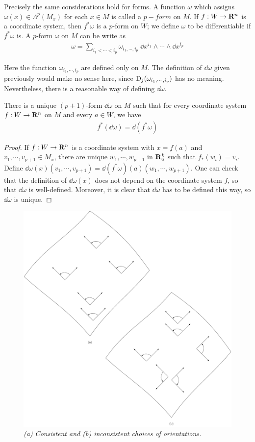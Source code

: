 Precisely the same considerations hold for forms. A function $\omega$ which 
assigns $\omega(x)\in\Lambda^p(M_x)$ for each $x\in M$ is called a $p-form$ on $M$. If 
$f:W\to \mathbf{R}^n$ is a coordinate system, then $f^*\omega$ is a $p$-form on $W$; we 
define $\omega$ to be differentiable if $f^*\omega$ is. A $p$-form $\omega$ on $M$ can be 
write as 
\begin{align*}
    \omega = \sum_{i_1<\cdots<i_p}^{}{\omega_{i_1,\cdots,i_p}\;\dd x^{i_1}\wedge\cdots\wedge\dd x^{i_p}}    
\end{align*}

Here the function $\omega_{i_1,\cdots,i_p}$ are defined only on $M$. The definition of $\dd \omega$ 
given previously would make no sense here, since $\mathrm{D}_j(\omega_{i_1,\cdots,i_p})$ has no meaning. 
Nevertheless, there is a reasonable way of defining $\dd\omega$.

\begin{theorem}
    There is a unique $(p+1)$-form $\dd\omega$ on $M$ such that for every 
    coordinate system $f:W\to \mathbf{R}^n$ on $M$ and every $a\in W$, we have 
    \begin{align*}
        f^*(\dd\omega) = \dd (f^*\omega)
    \end{align*}
\end{theorem}

\begin{proof}
    If $f:W\to\mathbf{R}^n$ is a coordinate system with $x=f(a)$ and $v_1,\cdots,v_{p+1}\in M_x$,
    there are unique $w_1,\cdots,w_{p+1}$ in $\mathbf{R}^k_a$ such that $f_*(w_i) = v_i$. 
    Define $\dd\omega(x)(v_1,\cdots,v_{p+1}) = \dd(f^*\omega)(a)(w_1,\cdots,w_{p+1})$. One can 
    check that the definition of $\dd\omega(x)$ does not depend on the coordinate system $f$,
    so that $\dd\omega$ is well-defined. Moreover, it is clear that $\dd\omega$ has to be 
    defined this way, so $\dd\omega$ is unique.
\end{proof}

\begin{figure}[!htb]
    \centering
    \includegraphics[width=.75\linewidth]{./pics/Fig5-6.pdf}
    \caption{\textit{\textup{(a)} Consistent and \textup{(b)} inconsistent choices of orientations.}}
    \label{Fig 5-6}
\end{figure}

